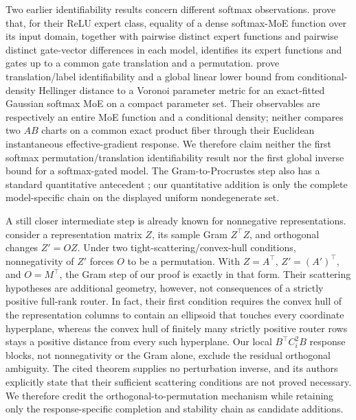 Two earlier identifiability results concern different softmax observations.
\citet[Thm.~4.1]{tran2025linear} prove that, for their ReLU expert class,
equality of a dense softmax-MoE function over its input domain, together with
pairwise distinct expert functions and pairwise distinct gate-vector
differences in each model, identifies its expert functions and gates up to a common gate translation
and a permutation.  \citet[Prop.~1 and Thm.~1]{nguyen2023demystifying} prove
translation/label identifiability and a global linear lower bound from
conditional-density Hellinger distance to a Voronoi parameter metric for an
exact-fitted Gaussian softmax MoE on a compact parameter set.  Their
observables are respectively an entire MoE function and a conditional
density; neither compares two $AB$ charts on a common exact product fiber
through their Euclidean instantaneous effective-gradient response.  We
therefore claim neither the first softmax permutation/translation
identifiability result nor the first global inverse bound for a softmax-gated
model.  The Gram-to-Procrustes step also has a standard quantitative
antecedent \citep[Lem.~5.4]{tu2016lowrank}; our quantitative addition is only
the complete model-specific chain on the displayed uniform nondegenerate set.

A still closer intermediate step is already known for nonnegative
representations.  \citet[Theorem~2 and Appendix~D.2]{dorrell2026convex}
consider a representation matrix \(Z\), its sample Gram \(Z^\top Z\), and
orthogonal changes \(Z'=OZ\).  Under two tight-scattering/convex-hull
conditions, nonnegativity of \(Z'\) forces \(O\) to be a permutation.  With
\(Z=A^\top\), \(Z'=(A')^\top\), and \(O=M^\top\), the Gram step of our proof is
exactly in that form.  Their scattering hypotheses are additional geometry,
however, not consequences of a strictly positive full-rank router.  In fact,
their first condition requires the convex hull of the representation columns
to contain an ellipsoid that touches every coordinate hyperplane, whereas the
convex hull of finitely many strictly positive router rows stays a positive
distance from every such hyperplane.  Our local \(B^\top C_i^2B\) response
blocks, not nonnegativity or the Gram alone, exclude the residual orthogonal
ambiguity.  The cited theorem supplies no perturbation inverse, and its
authors explicitly state that their sufficient scattering conditions are not
proved necessary.  We therefore credit the orthogonal-to-permutation
mechanism while retaining only the response-specific completion and stability
chain as candidate additions.


